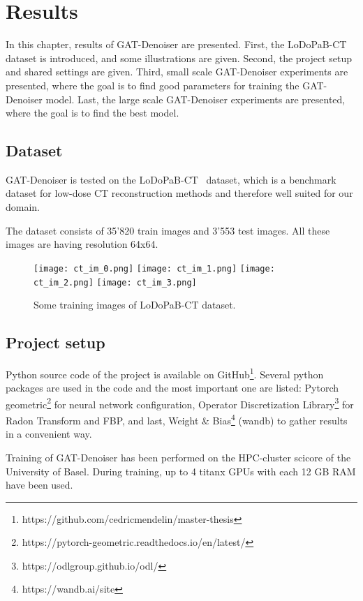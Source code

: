 \chapter{Results}
\label{sec:results}

In this chapter, results of GAT-Denoiser are presented.
First, the LoDoPaB-CT dataset is introduced, and some illustrations are given.
Second, the project setup and shared settings are given.
Third, small scale GAT-Denoiser experiments are presented, where the goal is to find
good parameters for training the GAT-Denoiser model.
Last, the large scale GAT-Denoiser experiments are presented, where the goal is 
to find the best model.



\section{Dataset}
GAT-Denoiser is tested on the LoDoPaB-CT~\cite{lodopab-dataset} dataset, which is a 
benchmark dataset for low-dose CT reconstruction methods and therefore well suited for our domain.

The dataset consists of 35'820 train images and 3'553 test images.
All these images are having resolution 64x64.

\begin{figure}[H]
  \centering
  \hfill
  \texttt{[image: ct\_im\_0.png]}
  \hfill
  \texttt{[image: ct\_im\_1.png]}
  \hfill
  \texttt{[image: ct\_im\_2.png]}
  \hfill
  \texttt{[image: ct\_im\_3.png]}
  \hfill
  \caption{Some training images of LoDoPaB-CT dataset.}
\end{figure}



\section{Project setup}
Python source code of the project is available on GitHub\footnote{https://github.com/cedricmendelin/master-thesis}.
Several python packages are used in the code and the most important one are listed: Pytorch geometric\footnote{https://pytorch-geometric.readthedocs.io/en/latest/} 
for neural network configuration, Operator Discretization Library\footnote{https://odlgroup.github.io/odl/} for Radon Transform and FBP, 
and last, Weight \& Bias\footnote{https://wandb.ai/site} (wandb) to gather results in a convenient way.

Training of GAT-Denoiser has been performed on the HPC-cluster scicore of the University of Basel.
During training, up to 4 titanx GPUs with each 12 GB RAM have been used.


